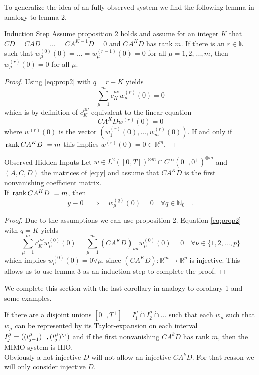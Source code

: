 To generalize the idea of an fully observed system we find the following lemma in analogy 
to lemma 2.
\begin{lemma}{Induction Step}{}
	Assume proposition 2 holds and assume for an integer $K$ 
	that $CD=CAD=\ldots = CA^{K-1}D = 0$ and $CA^KD$ has rank $m$. If there is an $r\in
	\mathbb{N}$ such that $w_\mu^{(0)}(0)=\ldots =w_\mu^{(r-1)}(0)=0$ for all $\mu =
	1,2,\ldots , m$, then $w_\mu^{(r)}(0)=0$ for all $\mu$.
\end{lemma}
\begin{proof}
	Using \eqref{eq:prop2} with $q=r+K$ yields
	\begin{equation}
	\sum\limits_{\mu=1}^m c_K^{\mu\nu} w_\mu^{(r)}(0) = 0
	\end{equation}
	which is by definition of $c_K^{\mu\nu}$ equivalent to the linear equation 
	\begin{equation}
	CA^K D w^{(r)} (0) = 0
	\end{equation}
	where $w^{(r)}(0)$ is the vector $(w_1^{(r)}(0),\ldots,w_m^{(r)}(0))$. If and only if 
	$ \, \text{rank}\,CA^KD \,\,  = m$ this implies $w^{(r)}(0)=0\in\mathbb{R}^m$.
\end{proof}

\begin{theorem}{Observed Hidden Inputs}{}
	Let $w\in L^2([0,T])^{\otimes m}\cap C^\infty(0^-,0^+)^{\otimes m}$ and $(A,C,D)$ the 
	matrices of 
	\eqref{eq:y} and assume that $CA^KD$ is the first nonvanishing coefficient matrix.\\ If 
	$ \, \text{rank}\,CA^KD \,\,  = m$, then
	\begin{equation}
	y \equiv 0 \quad \Rightarrow \quad w_\mu^{(q)}(0) = 0 \quad \forall q\in\mathbb{N}_0
	\quad .
\end{equation}	 
\end{theorem}
\begin{proof}
	Due to the assumptions we can use proposition 2. Equation \eqref{eq:prop2} with 
	$q = K$ yields
	\begin{equation}
	\sum\limits_{\mu=1}^m c_K^{\mu\nu} w_\mu^{(0)}(0) = 
	\sum\limits_{\mu=1}^m \left( CA^KD\right)_{\nu\mu} w_\mu^{(0)}(0)= 0 \quad \forall 
	\nu \in \{1,2,\ldots, p\}
	\end{equation}
	which implies $w_\mu^{(0)}(0)=0\forall \mu$, since $(CA^KD):\mathbb{R}^m
	\to\mathbb{R}^p$ is injective. This allows us to use lemma 3 as an induction step to 
	complete the proof.
\end{proof}

We complete this section with the last corollary in analogy to corollary 1 and some 
examples.
\begin{corollary}{}{}
	If there are a disjoint unions $[0^-,T^+]=I^\mu_1\dot{\cap} I_2^\mu\dot{\cap}\ldots$ 
	such that each $w_\mu$ such that $w_\mu$ can be represented by its Taylor-expansion on 
	each interval $I_j^\mu=((t_{j-1}^\mu)^- ,(t_j^\mu)^\+)$ and if the first nonvanishing 
	$CA^kD$ has rank $m$, then the MIMO-system is HIO. \\
	
	Obviously a not injective $D$ will not allow an injective $CA^kD$. For that reason
	we will only consider injective $D$. 
\end{corollary}

